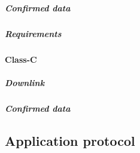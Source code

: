 \subparagraph{Confirmed data}


\subparagraph{Requirements}



\paragraph{Class-C}

\subparagraph{Downlink}

\subparagraph{Confirmed data}


\subsection{Application protocol}


